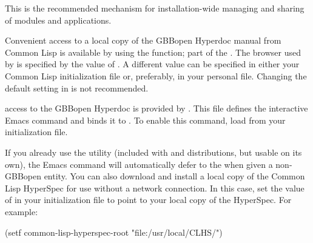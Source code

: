 \documentclass[10pt,twoside,english,pdftex]{article}
\begin{document}
This is the recommended mechanism for installation-wide managing and sharing
of modules and applications.

\label{sec:hyperdoc}
%
%
%
%
%
%
%
%
%
%
%

Convenient access to a local copy of the GBBopen Hyperdoc manual from Common
Lisp is available by using the 
function; part of the 
. The browser used by 
is specified by the value of .  A
different value can be specified in either your Common Lisp initialization
file or, preferably, in your personal  file.
Changing the default setting in  is not recommended.

 access to the
GBBopen Hyperdoc is provided by
.  This file
defines the interactive Emacs command  and
binds it to .  To enable this command, load
 from your
 initialization file.

If you already use the
utility (included with
 and
 distributions, but
usable on its own), the Emacs  command will
automatically defer to the  when given a
non-GBBopen entity.  You can also download and install a local copy of the
Common Lisp HyperSpec for use without a network connection.  In this case, set
the value of  in your 
initialization file to point to your local copy of the HyperSpec.  For
example:
%
\W\supp
\begin{example}
  (setf common-lisp-hyperspec-root "file:/usr/local/CLHS/")
\end{example}
\end{document}
